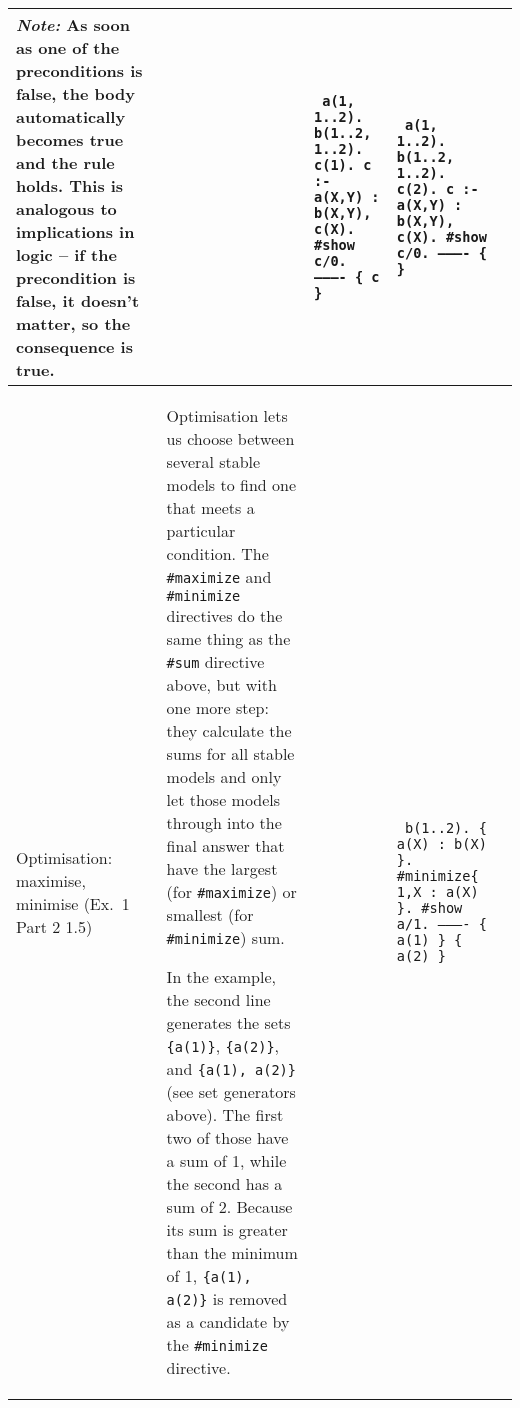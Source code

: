 \documentclass[10pt,a4paper,landscape]{article}
\begin{document}
\begin{longtable}{Lp{13.5cm}lXX}
		\textit{Note:} As soon as one of the preconditions is false, the body automatically becomes true and the rule holds.
		This is analogous to implications in logic -- if the precondition is false, it doesn't matter, so the consequence is true.
		
		&& {\scriptsize\texttt{%
			a(1, 1..2). \newline
			b(1..2, 1..2). \newline
			c(1). \newline
			c :- a(X,Y) : b(X,Y), c(X).\newline
			\#show c/0.\newline
			---------- \newline
			\{ c \} \newline
		}} & {\scriptsize\texttt{%
			a(1, 1..2). \newline
			b(1..2, 1..2). \newline
			c(2). \newline
			c :- a(X,Y) : b(X,Y), c(X).\newline
			\#show c/0.\newline
			---------- \newline
			\{ \} \newline
		}}
		
		\\ \midrule
	
	Optimisation: maximise, minimise \newline (Ex.\ 1 Part 2 1.5)
		& Optimisation lets us choose between several stable models to find one that meets a particular condition. The \texttt{\#maximize} and \texttt{\#minimize} directives do the same thing as the \texttt{\#sum} directive above, but with one more step: they calculate the sums for all stable models and only let those models through into the final answer that have the largest (for \texttt{\#maximize}) or smallest (for \texttt{\#minimize}) sum. \newline
		
		In the example, the second line generates the sets \texttt{\{a(1)\}}, \texttt{\{a(2)\}}, and \texttt{\{a(1), a(2)\}} (see set generators above).
		The first two of those have a sum of 1, while the second has a sum of 2.
		Because its sum is greater than the minimum of 1, \texttt{\{a(1), a(2)\}} is removed as a candidate by the \texttt{\#minimize} directive.
		
		&& {\footnotesize\texttt{%
			b(1..2). \{ a(X) : b(X) \}.\newline
			\#minimize\{ 1,X : a(X) \}.\newline
			\#show a/1.\newline
			---------- \newline
			\{ a(1) \} \newline
			\{ a(2) \} \newline
		}} &\\  \midrule
	

\end{longtable}
\end{document}
